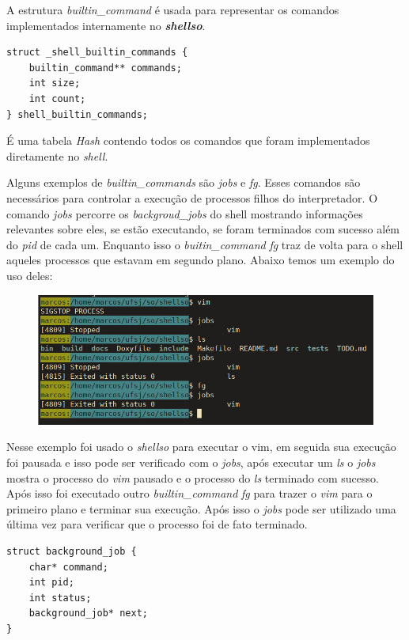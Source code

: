 \documentclass[a4paper, 12pt]{article}
\begin{document}
A estrutura \textit{builtin\_command} é usada para representar os comandos implementados
internamente no \textbf{\textit{shellso}}.

\begin{verbatim}
struct _shell_builtin_commands {
    builtin_command** commands;
    int size;
    int count;
} shell_builtin_commands;
\end{verbatim}

É uma tabela \textit{Hash} contendo todos os comandos que foram implementados diretamente
no \textit{shell}.

Alguns exemplos de \textit{builtin\_commands} são \textit{jobs} e \textit{fg}. Esses comandos
são necessários para controlar a execução de processos filhos do interpretador. O comando 
\textit{jobs} percorre os \textit{backgroud\_jobs} do shell mostrando informações relevantes sobre eles,
se estão executando, se foram terminados com sucesso além do \textit{pid} de cada um. Enquanto isso
o \textit{buitin\_command} \textit{fg} traz de volta para o shell aqueles processos que estavam em segundo
plano. Abaixo temos um exemplo do uso deles:

\begin{figure}[!ht]
	\centering
	\includegraphics[width=12cm]{relatorio/jobs.jpeg}
\end{figure}

Nesse exemplo foi usado o \textit{shellso} para executar o vim,
em seguida sua execução foi pausada e isso pode ser verificado com
o \textit{jobs}, após executar um \textit{ls} o \textit{jobs} mostra
o processo do \textit{vim} pausado e o processo do \textit{ls} terminado com sucesso.
Após isso foi executado outro \textit{builtin\_command} \textit{fg}
para trazer o \textit{vim} para o primeiro plano e terminar sua execução.
Após isso o \textit{jobs} pode ser utilizado uma última vez para verificar que o processo foi de fato terminado.


\begin{verbatim}
struct background_job {
    char* command;
    int pid;
    int status;
    background_job* next;
}
\end{verbatim}
\end{document}
